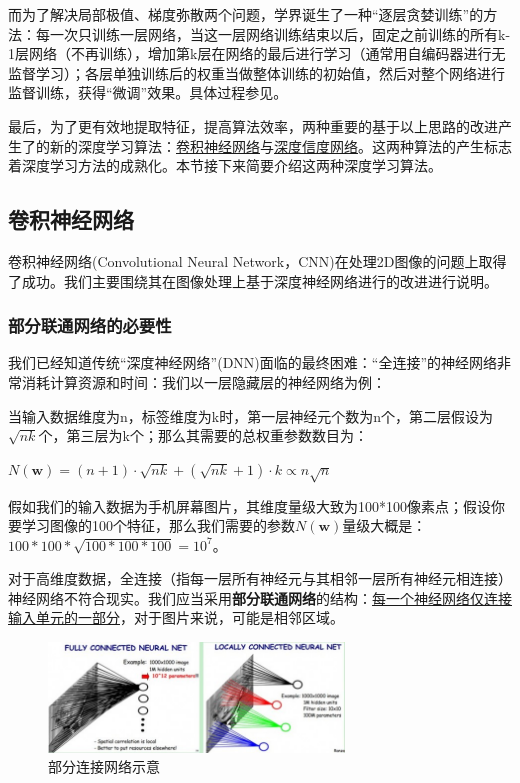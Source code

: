 而为了解决局部极值、梯度弥散两个问题，学界诞生了一种“逐层贪婪训练”的方法：每一次只训练一层网络，当这一层网络训练结束以后，固定之前训练的所有k-1层网络（不再训练），增加第k层在网络的最后进行学习（通常用自编码器进行无监督学习）；各层单独训练后的权重当做整体训练的初始值，然后对整个网络进行监督训练，获得“微调”效果。具体过程参见\cite{deep_learning_ufldl}。


最后，为了更有效地提取特征，提高算法效率，两种重要的基于以上思路的改进产生了的新的深度学习算法：\uline{卷积神经网络}\cite{hinton2006fast}与\uline{深度信度网络}\cite{lee2009convolutional}。这两种算法的产生标志着深度学习方法的成熟化。本节接下来简要介绍这两种深度学习算法。

\subsection{卷积神经网络}
卷积神经网络(Convolutional Neural Network，CNN)在处理2D图像的问题上取得了成功。我们主要围绕其在图像处理上基于深度神经网络进行的改进进行说明。

\subsubsection{部分联通网络的必要性}
我们已经知道传统“深度神经网络”(DNN)面临的最终困难：“全连接”的神经网络非常消耗计算资源和时间：我们以一层隐藏层的神经网络为例：

当输入数据维度为n，标签维度为k时，第一层神经元个数为n个，第二层假设为$\sqrt{nk}$个，第三层为k个；那么其需要的总权重参数数目为：

$N(\mathbf{w}) = (n+1)\cdot\sqrt{nk} + (\sqrt{nk}+1)\cdot k \propto n\sqrt{n}$

假如我们的输入数据为手机屏幕图片，其维度量级大致为100*100像素点；假设你要学习图像的100个特征，那么我们需要的参数$N(\mathbf{w})$量级大概是：$100*100*\sqrt{100*100*100} = 10^7$。

对于高维度数据，全连接（指每一层所有神经元与其相邻一层所有神经元相连接）神经网络不符合现实。我们应当采用\textbf{部分联通网络}的结构：\uline{每一个神经网络仅连接输入单元的一部分}，对于图片来说，可能是相邻区域。

\begin{figure}[htbp]
   \centering
   \includegraphics[width=0.7\textwidth]{LocallyConnectedNetwork.jpg} %
   \caption{部分连接网络示意}
   \label{fig:localnetwork}
\end{figure}

